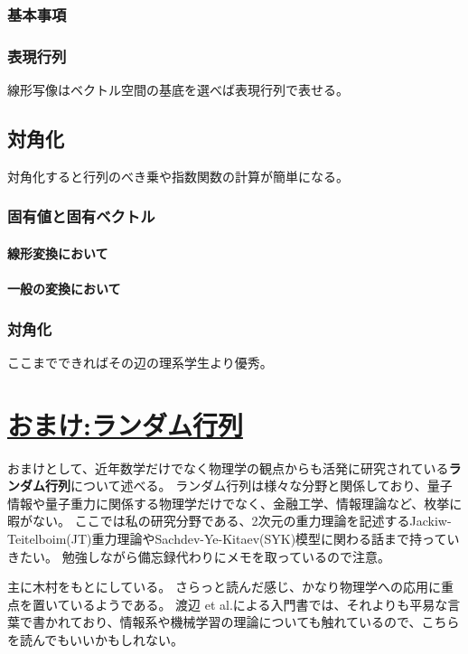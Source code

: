 \documentclass[10pt]{jsreport}
\theoremstyle{definition}%
\numberwithin{equation}{section}%
\begin{document}
\subsection{基本事項}
\subsection{表現行列}
線形写像はベクトル空間の基底を選べば表現行列で表せる。
\section{対角化}
対角化すると行列のべき乗や指数関数の計算が簡単になる。
\subsection{固有値と固有ベクトル}
\subsubsection{線形変換において}
\subsubsection{一般の変換において}
\subsection{対角化}
ここまでできればその辺の理系学生より優秀。

\appendix
\chapter{\underline{おまけ:ランダム行列}}
おまけとして、近年数学だけでなく物理学の観点からも活発に研究されている{\bf ランダム行列}について述べる。
ランダム行列は様々な分野と関係しており、量子情報や量子重力に関係する物理学だけでなく、金融工学、情報理論など、枚挙に暇がない。
ここでは私の研究分野である、2次元の重力理論を記述するJackiw-Teitelboim(JT)重力理論やSachdev-Ye-Kitaev(SYK)模型に関わる話まで持っていきたい。
勉強しながら備忘録代わりにメモを取っているので注意。

主に木村\cite{randam-kimura}をもとにしている。
さらっと読んだ感じ、かなり物理学への応用に重点を置いているようである。
渡辺 et al.による入門書\cite{randam-wnktn}では、それよりも平易な言葉で書かれており、情報系や機械学習の理論についても触れているので、こちらを読んでもいいかもしれない。
\end{document}
